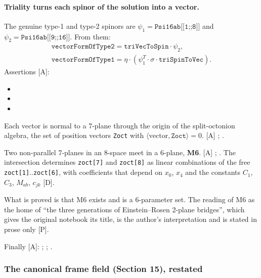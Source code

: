 \paragraph{Triality turns each spinor of the solution into a vector.} The genuine type-1 and
type-2 spinors are $\psi_1=\texttt{Psi16ab[[1;;8]]}$ and $\psi_2=\texttt{Psi16ab[[9;;16]]}$. From
them:
\begin{gather}
  \texttt{vectorFormOfType2}=\texttt{triVecToSpin}\cdot\psi_2,\\
  \texttt{vectorFormOfType1}=\eta\cdot(\psi_1^{T}\cdot\sigma\cdot\texttt{triSpinToVec}).
\end{gather}
Assertions [A]:
\begin{itemize}
  \item {}
  \item {}
  \item {}
\end{itemize}
Each vector is normal to a 7-plane through the origin of the split-octonion algebra, the set of
position vectors \texttt{Zoct} with $\langle\text{vector},\texttt{Zoct}\rangle=0$. [A]
;
.

Two non-parallel 7-planes in an 8-space meet in a 6-plane, \textbf{M6}. [A]
; . The intersection
determines \texttt{zoct[7]} and \texttt{zoct[8]} as linear combinations of the free
\texttt{zoct[1]}..\texttt{zoct[6]}, with coefficients that depend on $x_0$, $x_4$ and the
constants $C_1$, $C_3$, $M_{ab}$, $c_{jk}$ [D].

What is proved is that M6 exists and is a 6-parameter set. The reading of M6 as the home of
``the three generations of Einstein--Rosen 2-plane bridges'', which gives the original notebook
its title, is the author's interpretation and is stated in prose only [P].

Finally [A]: ;
;
.

\subsubsection{The canonical frame field (Section 15), restated}
\label{fnd:frame}\label{sec:3.1.11}


